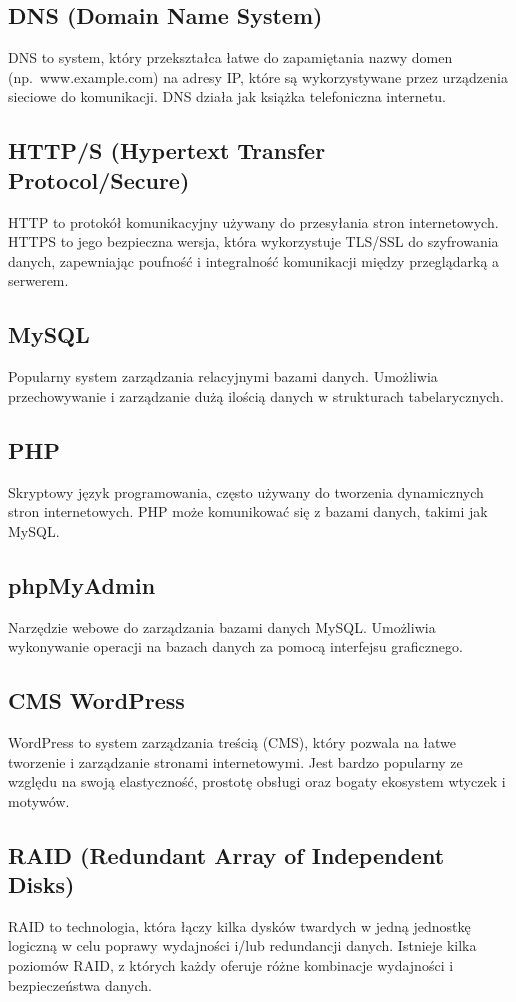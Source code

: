 \documentclass[a4paper]{article}
\begin{document}
\subsection{DNS (Domain Name System)}
DNS to system, który przekształca łatwe do zapamiętania nazwy domen (np.\ www.example.com) na adresy IP, które są wykorzystywane przez urządzenia sieciowe do komunikacji. DNS działa jak książka telefoniczna internetu.

\subsection{HTTP/S (Hypertext Transfer Protocol/Secure)}
HTTP to protokół komunikacyjny używany do przesyłania stron internetowych. HTTPS to jego bezpieczna wersja, która wykorzystuje TLS/SSL do szyfrowania danych, zapewniając poufność i integralność komunikacji między przeglądarką a serwerem.

\subsection{MySQL}
Popularny system zarządzania relacyjnymi bazami danych. Umożliwia przechowywanie i zarządzanie dużą ilością danych w strukturach tabelarycznych.

\subsection{PHP}
Skryptowy język programowania, często używany do tworzenia dynamicznych stron internetowych. PHP może komunikować się z bazami danych, takimi jak MySQL.

\subsection{phpMyAdmin}
Narzędzie webowe do zarządzania bazami danych MySQL. 
Umożliwia wykonywanie operacji na bazach danych za pomocą interfejsu graficznego.

\subsection{CMS WordPress}
WordPress to system zarządzania treścią (CMS), który pozwala na łatwe tworzenie i zarządzanie stronami internetowymi. Jest bardzo popularny ze względu na swoją elastyczność, prostotę obsługi oraz bogaty ekosystem wtyczek i motywów.

\subsection{RAID (Redundant Array of Independent Disks)}
RAID to technologia, która łączy kilka dysków twardych w jedną jednostkę logiczną w celu poprawy wydajności i/lub redundancji danych. Istnieje kilka poziomów RAID, z których każdy oferuje różne kombinacje wydajności i bezpieczeństwa danych.
\end{document}

